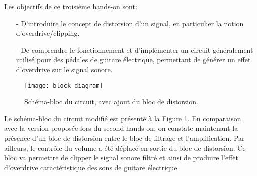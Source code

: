 Les objectifs de ce troisième hands-on sont:
\begin{itemize}
	\item[-] D'introduire le concept de distorsion d'un signal, en particulier la notion d'overdrive/clipping.
	\item[-] De comprendre le fonctionnement et d'implémenter un circuit généralement utilisé pour des pédales de guitare électrique, permettant de générer un effet d'overdrive sur le signal sonore.
\end{itemize}
\vspace{.25cm}

\begin{figure} [!ht]
	\centering
	\texttt{[image: block-diagram]}
	\caption{Schéma-bloc du circuit, avec ajout du bloc de distorsion.}
	\label{fig1:block-diagram}
\end{figure}

Le schéma-bloc du circuit modifié est présenté à la Figure \ref{fig1:block-diagram}. En comparaison avec la version proposée lors du second hands-on, on constate maintenant la présence d'un bloc de distorsion entre le bloc de filtrage et l'amplification. Par ailleurs, le contrôle du volume a été déplacé en sortie du bloc de distorsion. Ce bloc va permettre de clipper le signal sonore filtré et ainsi de produire l'effet d'overdrive caractéristique des sons de guitare électrique.